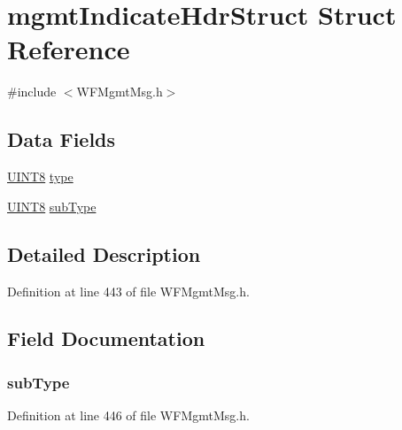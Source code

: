 \hypertarget{structmgmt_indicate_hdr_struct}{}\section{mgmt\+Indicate\+Hdr\+Struct Struct Reference}
\label{structmgmt_indicate_hdr_struct}


{\ttfamily \#include $<$W\+F\+Mgmt\+Msg.\+h$>$}

\subsection*{Data Fields}
\begin{DoxyCompactItemize}
\item 
\hyperlink{_generic_type_defs_8h_ab27e9918b538ce9d8ca692479b375b6a}{U\+I\+N\+T8} \hyperlink{structmgmt_indicate_hdr_struct_a631bceb766461ab7475c7ed56717aac8}{type}
\item 
\hyperlink{_generic_type_defs_8h_ab27e9918b538ce9d8ca692479b375b6a}{U\+I\+N\+T8} \hyperlink{structmgmt_indicate_hdr_struct_a6b8a16b4fff234af40d01cd46be5be45}{sub\+Type}
\end{DoxyCompactItemize}


\subsection{Detailed Description}


Definition at line 443 of file W\+F\+Mgmt\+Msg.\+h.



\subsection{Field Documentation}
\hypertarget{structmgmt_indicate_hdr_struct_a6b8a16b4fff234af40d01cd46be5be45}{}
\subsubsection[{sub\+Type}]{ sub\+Type}\label{structmgmt_indicate_hdr_struct_a6b8a16b4fff234af40d01cd46be5be45}


Definition at line 446 of file W\+F\+Mgmt\+Msg.\+h.

\hypertarget{structmgmt_indicate_hdr_struct_a631bceb766461ab7475c7ed56717aac8}{}
